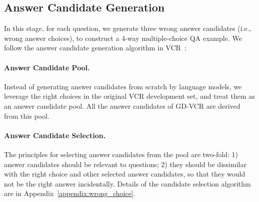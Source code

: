 \documentclass[11pt]{article}
\begin{document}
\subsection{Answer Candidate Generation}
\label{sec:wrong_choice_generation}
In this stage, for each question, we generate three wrong answer candidates (i.e., wrong answer choices), to construct a 4-way multiple-choice QA example. We follow the answer candidate generation algorithm in VCR~\cite{zellers2019vcr}: 
\paragraph{Answer Candidate Pool.} Instead of generating answer candidates from scratch by language models, we leverage the right choices in the original VCR development set, and treat them as an answer candidate pool. All the answer candidates of GD-VCR are derived from this pool. 

\paragraph{Answer Candidate Selection.} The principles for selecting answer candidates from the pool are two-fold: 1) answer candidates should be relevant to questions; 2) they should be dissimilar with the right choice and other selected answer candidates, so that they would not be the right answer incidentally. 
Details of the candidate selection algorithm are in Appendix~\ref{appendix:wrong_choice}.

\begin{table*}[t]
    \centering
    \caption{Statistics of the GD-VCR benchmark. The top half of the table is the overall statistics of GD-VCR and the original VCR development set. The bottom half includes the subsets of each region in GD-VCR.}
  \label{tab:datasets}
\end{table*}
\end{document}

